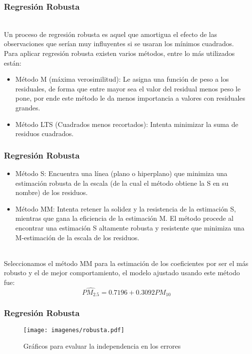 \documentclass[12pt]{beamer}
\begin{document}
\begin{frame}
\frametitle{Regresión Robusta}
~\\Un proceso de regresión robusta es aquel que amortigua el efecto de las observaciones que serían muy influyentes si se usaran los mínimos cuadrados.
~\\Para aplicar regresión robusta existen varios métodos, entre lo más utilizados están:
\begin{itemize}
\item Método M (máxima verosimilitud): Le asigna una función de peso a los residuales, de forma que entre mayor sea el valor del residual menos peso le pone, por ende este método le da menos importancia a valores con residuales grandes.
\item Método LTS (Cuadrados menos recortados): Intenta minimizar la suma de residuos cuadrados.
\end{itemize}
\end{frame}

\begin{frame}
\frametitle{Regresión Robusta}
\begin{itemize}
\item Método S: Encuentra una línea (plano o hiperplano) que minimiza una estimación robusta de la escala (de la cual el método obtiene la S en su nombre) de los residuos.
\item Método MM: Intenta retener la solidez y la resistencia de la estimación S, mientras que gana la eficiencia de la estimación M. El método procede al encontrar una estimación S altamente robusta y resistente que minimiza una M-estimación de la escala de los residuos.
\end{itemize}
~\\Seleccionamos el método MM para la estimación de los coeficientes por ser el más robusto y el de mejor comportamiento, el modelo ajustado usando este método fue:
$$\hat{PM_{2.5}}=0.7196+0.3092 PM_{10}$$

\end{frame}

\begin{frame}
\frametitle{Regresión Robusta}
\begin{figure}[h]
  \centering
  \texttt{[image: imagenes/robusta.pdf]}
  \caption{Gráficos para evaluar la independencia en los errores}\label{figura1}
\end{figure}
\end{frame}
\end{document}
